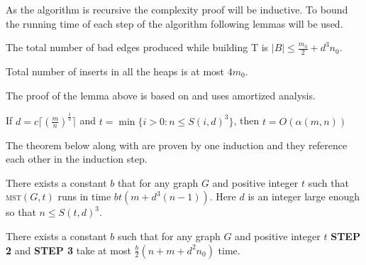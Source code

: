 As the algorithm is recursive the complexity proof will be inductive. To bound the running time of each step of the algorithm following lemmas will be used.

\begin{lemma}
The total number of bad edges produced while building T is $|B| \leq \frac{m_0}2 + d^3n_0$.
\label{decay}
\end{lemma}
\begin{lemma}
\label{inserts}
Total number of inserts in all the heaps is at most $4m_0$.
\end{lemma}

The proof of the lemma above is based on  and uses amortized analysis.

\begin{theorem}
If $d=c\lceil(\frac{m}n)^\frac13\rceil$ and $t = \min\{i > 0\colon n \leq S(i, d)^3\}$, then $t = O(\alpha(m, n))$
\label{acker}
\end{theorem}

The theorem below along with  are proven by one induction and they reference each other in the induction step. 
\begin{theorem}
    There exists a constant $b$ that for any graph $G$ and positive integer $t$ such that \textsc{mst}$(G, t)$ runs in time $bt(m + d^3(n-1))$. Here $d$ is an integer large enough so that $n \leq S(t, d)^3$.
\label{ctime}
\end{theorem}
\begin{lemma}
    There exists a constant $b$ such that for any graph $G$ and positive integer $t$ \textbf{STEP 2} and \textbf{STEP 3} take at most $\frac{b}2(n+m+d^2n_0)$ time. 
    \label{s23}
\end{lemma}

